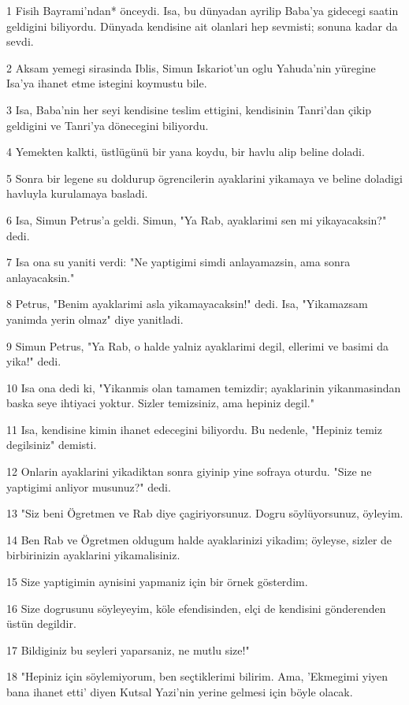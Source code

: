 \par 1 Fisih Bayrami'ndan* önceydi. Isa, bu dünyadan ayrilip Baba'ya gidecegi saatin geldigini biliyordu. Dünyada kendisine ait olanlari hep sevmisti; sonuna kadar da sevdi.
\par 2 Aksam yemegi sirasinda Iblis, Simun Iskariot'un oglu Yahuda'nin yüregine Isa'ya ihanet etme istegini koymustu bile.
\par 3 Isa, Baba'nin her seyi kendisine teslim ettigini, kendisinin Tanri'dan çikip geldigini ve Tanri'ya dönecegini biliyordu.
\par 4 Yemekten kalkti, üstlügünü bir yana koydu, bir havlu alip beline doladi.
\par 5 Sonra bir legene su doldurup ögrencilerin ayaklarini yikamaya ve beline doladigi havluyla kurulamaya basladi.
\par 6 Isa, Simun Petrus'a geldi. Simun, "Ya Rab, ayaklarimi sen mi yikayacaksin?" dedi.
\par 7 Isa ona su yaniti verdi: "Ne yaptigimi simdi anlayamazsin, ama sonra anlayacaksin."
\par 8 Petrus, "Benim ayaklarimi asla yikamayacaksin!" dedi. Isa, "Yikamazsam yanimda yerin olmaz" diye yanitladi.
\par 9 Simun Petrus, "Ya Rab, o halde yalniz ayaklarimi degil, ellerimi ve basimi da yika!" dedi.
\par 10 Isa ona dedi ki, "Yikanmis olan tamamen temizdir; ayaklarinin yikanmasindan baska seye ihtiyaci yoktur. Sizler temizsiniz, ama hepiniz degil."
\par 11 Isa, kendisine kimin ihanet edecegini biliyordu. Bu nedenle, "Hepiniz temiz degilsiniz" demisti.
\par 12 Onlarin ayaklarini yikadiktan sonra giyinip yine sofraya oturdu. "Size ne yaptigimi anliyor musunuz?" dedi.
\par 13 "Siz beni Ögretmen ve Rab diye çagiriyorsunuz. Dogru söylüyorsunuz, öyleyim.
\par 14 Ben Rab ve Ögretmen oldugum halde ayaklarinizi yikadim; öyleyse, sizler de birbirinizin ayaklarini yikamalisiniz.
\par 15 Size yaptigimin aynisini yapmaniz için bir örnek gösterdim.
\par 16 Size dogrusunu söyleyeyim, köle efendisinden, elçi de kendisini gönderenden üstün degildir.
\par 17 Bildiginiz bu seyleri yaparsaniz, ne mutlu size!"
\par 18 "Hepiniz için söylemiyorum, ben seçtiklerimi bilirim. Ama, 'Ekmegimi yiyen bana ihanet etti' diyen Kutsal Yazi'nin yerine gelmesi için böyle olacak.
